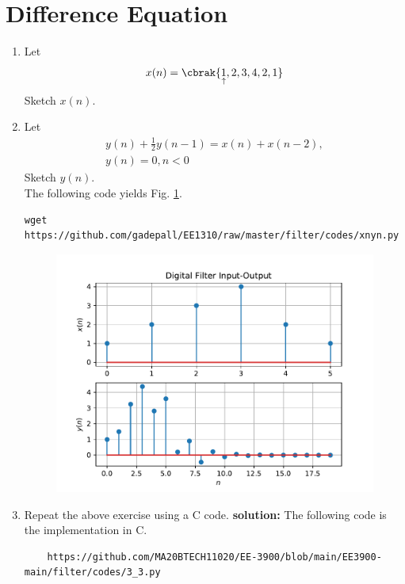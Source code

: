 \documentclass[journal,12pt,twocolumn]{IEEEtran}
\renewcommand\thesection{\arabic{section}}
\begin{document}
\section{Difference Equation}
\begin{enumerate}[label=\thesection.\arabic*,ref=\thesection.\theenumi]
\item Let
\label{def:xn}
\begin{equation}
x(n) = \cbrak{\underset{\uparrow}{1},2,3,4,2,1}
\end{equation}
Sketch $x(n)$.
\item Let
\begin{multline}
\label{eq:iir_filter}
y(n) + \frac{1}{2}y(n-1) = x(n) + x(n-2), 
\\
 y(n) = 0, n < 0
\end{multline}
Sketch $y(n)$.  
\\
\solution The following code yields Fig. \ref{fig:xnyn}.
\begin{lstlisting}
wget https://github.com/gadepall/EE1310/raw/master/filter/codes/xnyn.py
\end{lstlisting}
\begin{figure}[!ht]
\begin{center}
\includegraphics[width=\columnwidth]{figs/xnyn.pdf}
\end{center}
\label{fig:xnyn}	
\end{figure}
\item Repeat the above exercise using a C code.
\textbf{solution: } The following code is the implementation in C.

\begin{lstlisting}
    https://github.com/MA20BTECH11020/EE-3900/blob/main/EE3900-main/filter/codes/3_3.py
\end{lstlisting}


\end{enumerate}
\end{document}
